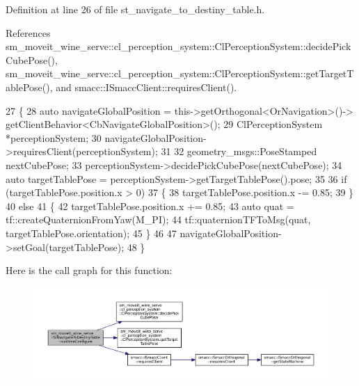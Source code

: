 Definition at line 26 of file st\+\_\+navigate\+\_\+to\+\_\+destiny\+\_\+table.\+h.



References sm\+\_\+moveit\+\_\+wine\+\_\+serve\+::cl\+\_\+perception\+\_\+system\+::\+Cl\+Perception\+System\+::decide\+Pick\+Cube\+Pose(), sm\+\_\+moveit\+\_\+wine\+\_\+serve\+::cl\+\_\+perception\+\_\+system\+::\+Cl\+Perception\+System\+::get\+Target\+Table\+Pose(), and smacc\+::\+I\+Smacc\+Client\+::requires\+Client().


\begin{DoxyCode}
27         \{
28             \textcolor{keyword}{auto} navigateGlobalPosition = this->getOrthogonal<OrNavigation>()->
      getClientBehavior<CbNavigateGlobalPosition>();
29             ClPerceptionSystem *perceptionSystem;
30             navigateGlobalPosition->requiresClient(perceptionSystem);
31 
32             geometry\_msgs::PoseStamped nextCubePose;
33             perceptionSystem->decidePickCubePose(nextCubePose);
34             \textcolor{keyword}{auto} targetTablePose = perceptionSystem->getTargetTablePose().pose;
35 
36             \textcolor{keywordflow}{if} (targetTablePose.position.x > 0)
37             \{
38                 targetTablePose.position.x -= 0.85;   
39             \}
40             \textcolor{keywordflow}{else}
41             \{
42                 targetTablePose.position.x += 0.85;
43                 \textcolor{keyword}{auto} quat = tf::createQuaternionFromYaw(M\_PI);
44                 tf::quaternionTFToMsg(quat, targetTablePose.orientation);
45             \}
46 
47             navigateGlobalPosition->setGoal(targetTablePose);
48         \}
\end{DoxyCode}
Here is the call graph for this function\+:
\nopagebreak
\begin{figure}[H]
\begin{center}
\leavevmode
\includegraphics[width=350pt]{structsm__moveit__wine__serve_1_1StNavigateToDestinyTable_a96bf1cd4c69ff8e85fc22286b338b550_cgraph}
\end{center}
\end{figure}
\mbox{\label{structsm__moveit__wine__serve_1_1StNavigateToDestinyTable_a6ea48672de95b53c246da5d1ffcbb8bf}} 
